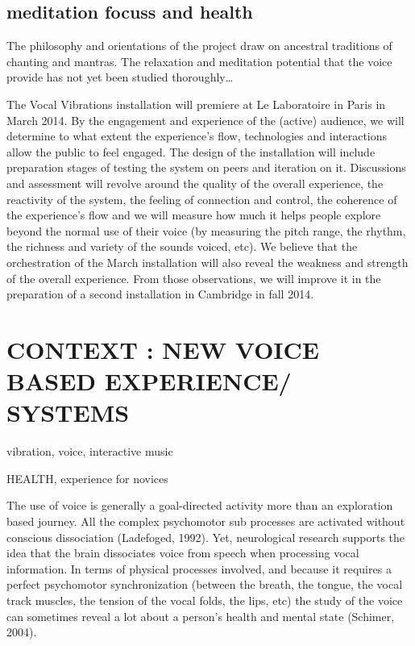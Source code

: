 \documentclass{nime-alternate}
\begin{document}
\subsection{meditation focuss and health}

The philosophy and orientations of the project draw on ancestral traditions of chanting and mantras. The relaxation and meditation potential that the voice provide has not yet been studied thoroughly…

The Vocal Vibrations installation will premiere at Le Laboratoire in Paris in March 2014. By the engagement and experience of the (active) audience, we will determine to what extent the experience’s flow, technologies and interactions allow the public to feel engaged. The design of the installation will include preparation stages of testing the system on peers and iteration on it. Discussions and assessment will revolve around the quality of the overall experience, the reactivity of the system, the feeling of connection and control, the coherence of the experience’s flow and we will measure how much it helps people explore beyond the normal use of their voice (by measuring the pitch range, the rhythm, the richness and variety of the sounds voiced, etc). We believe that the orchestration of the March installation will also reveal the weakness and strength of the overall experience. From those observations, we will improve it in the preparation of a second installation in Cambridge in fall 2014.


\section{CONTEXT : NEW VOICE BASED EXPERIENCE/ SYSTEMS}

vibration, voice, interactive music

HEALTH, experience for novices

The use of voice is generally a goal-directed activity more than an exploration based journey. All the complex psychomotor sub processes are activated without conscious dissociation (Ladefoged, 1992). Yet, neurological research supports the idea that the brain dissociates voice from speech when processing vocal information. In terms of physical processes involved, and because it requires a perfect psychomotor synchronization (between the breath, the tongue, the vocal track muscles, the tension of the vocal folds, the lips, etc) the study of the voice can sometimes reveal a lot about a person’s health and mental state (Schimer, 2004).
\end{document}

